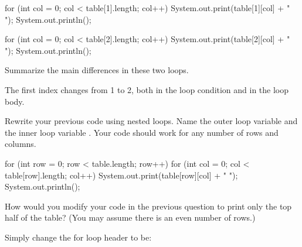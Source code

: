 \begin{answer}[12em]
\begin{javaans}
for (int col = 0; col < table[1].length; col++) {
    System.out.print(table[1][col] + " ");
}
System.out.println();

for (int col = 0; col < table[2].length; col++) {
    System.out.print(table[2][col] + " ");
}
System.out.println();
\end{javaans}
\end{answer}


\Q Summarize the main differences in these two  loops.

\begin{answer}[2em]
The first index changes from 1 to 2, both in the loop condition and in the loop body.
\end{answer}


\Q \label{key2}
Rewrite your previous code using nested  loops.
Name the outer loop variable  and the inner loop variable .
Your code should work for any number of rows and columns.

\begin{answer}[8em]
\begin{javaans}
for (int row = 0; row < table.length; row++) {
    for (int col = 0; col < table[row].length; col++) {
        System.out.print(table[row][col] + " ");
    }
    System.out.println();
}
\end{javaans}
\end{answer}


\Q How would you modify your code in the previous question to print only the top half of the table? (You may assume there is an even number of rows.)

\begin{answer}
Simply change the for loop header to be: \\[1ex]
\end{answer}
